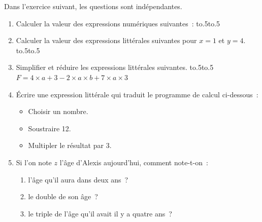 \documentclass{article}
\begin{document}
\pagestyle{empty}\sf

\newpage\advance{}\vskip10pt\noindent
\noindent Dans l'exercice suivant, les questions sont indépendantes.
\begin{enumerate}[font=\bfseries,label=\arabic*)]
    \item Calculer la valeur des expressions numériques suivantes~:\vskip8pt\noindent
    \hbox{\hbox to.5\linewidth{$A=-5+8-(-12)-16$\hfil}\hbox to.5\linewidth{$B=(-3-1)-(5-7)$\hfil}}\vskip100pt
    \item Calculer la valeur des expressions littérales suivantes pour
    $x=1$ et $y=4$.\vskip10pt\noindent
    \hbox{\hbox to.5\linewidth{$C=x^2+2xy+y^2$\hfil}\hbox to.5\linewidth{$D=3(y-2x)$\hfil}}\vskip100pt
    \item Simplifier et réduire les expressions littérales suivantes.\vskip8pt\noindent
    \hbox{\hbox to.5\linewidth{$E=5\times z+4,5-z+0,5$\hfil}\hbox to.5\linewidth
        {$F=4\times a+3-2\times a\times b+7\times a\times 3$\hfil}}\vskip100pt
    \item Écrire une expression littérale qui traduit le programme de calcul ci-dessous~:
    \begin{itemize}
        \item Choisir un nombre.
        \item Soustraire 12.
        \item Multipler le résultat par 3.
    \end{itemize}\dotedline
    \item Si l'on note $z$ l'âge d'Alexis aujourd'hui, comment note-t-on~:
    \begin{enumerate}
        \item l'âge qu'il aura dans deux ans~?\dotedline
        \item le double de son âge~?\dotedline
        \item le triple de l'âge qu'il avait il y a quatre ans~?\dotedline
    \end{enumerate}
\end{enumerate}
\end{document}
